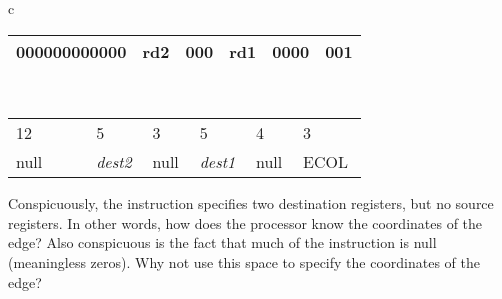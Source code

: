     \begin{table}[H]
    \begin{center}
    \begin{tabular}{c}
        \begin{tabular}{|m{0.2\linewidth}|m{0.1\linewidth}|m{0.1\linewidth}|m{0.1\linewidth}|m{0.1\linewidth}|m{0.1\linewidth}|}
        \hline
        \hspace*{0.5cm}000000000000 & \hspace*{0.5cm}rd2  & \hspace*{0.5cm}000  & \hspace*{0.5cm}rd1  & \hspace*{0.5cm}0000  & \hspace*{0.5cm}001  \\
        \hline
        \end{tabular} \\
        \begin{tabular}{m{0.2\linewidth}m{0.1\linewidth}m{0.1\linewidth}m{0.1\linewidth}m{0.1\linewidth}m{0.1\linewidth}}
        \hspace*{1.5cm}12 & \hspace*{0.5cm}5  & \hspace*{0.5cm}3  & \hspace*{0.5cm}5  & \hspace*{0.5cm}4  & \hspace*{0.5cm}3  \\
        \hspace*{1.3cm}null &  \hspace*{0.5cm}\textit{dest2} & \hspace*{0.5cm}null  & \hspace*{0.5cm}\textit{dest1}  &  \hspace*{0.5cm}null & \hspace*{0.25cm}ECOL  \\
        \end{tabular}
    \end{tabular}
    \end{center}
    \end{table}

    Conspicuously, the instruction specifies two destination registers, but no source registers. In other words, how does the processor know the coordinates of the edge? Also conspicuous is the fact that much of the instruction is null (meaningless zeros). Why not use this space to specify the coordinates of the edge?

